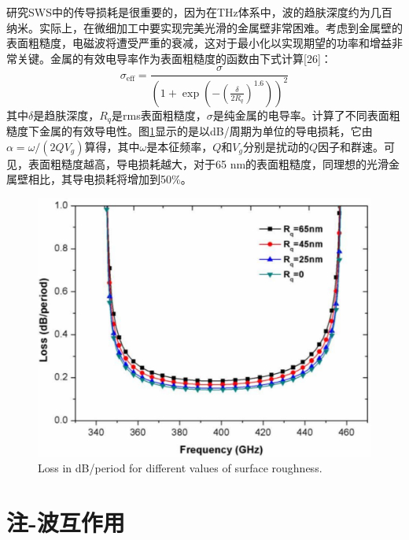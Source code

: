 \documentclass[10pt,a4paper,UTF8]{ctexart}
\begin{document}
研究SWS中的传导损耗是很重要的，因为在THz体系中，波的趋肤深度约为几百纳米。实际上，在微细加工中要实现完美光滑的金属壁非常困难。考虑到金属壁的表面粗糙度，电磁波将遭受严重的衰减，这对于最小化以实现期望的功率和增益非常关键。金属的有效电导率作为表面粗糙度的函数由下式计算[26]：
\begin{equation} \label{eq:2}
\sigma_{\mathrm{eff}} = \frac{\sigma}{\left( 1+\exp\left( -\left( \frac{\delta}{2R_q}\right)^{1.6}\right) \right)^2  }
\end{equation}
其中$ \delta $是趋肤深度，$ R_q $是rms表面粗糙度，$ \sigma $是纯金属的电导率。计算了不同表面粗糙度下金属的有效导电性。图\ref{fig6}显示的是以dB/周期为单位的导电损耗，它由$ \alpha = \omega/\left(2QV_g\right) $算得，其中$ \omega $是本征频率，$ Q $和$ V_g $分别是扰动的$ Q $因子和群速。可见，表面粗糙度越高，导电损耗越大，对于65 nm的表面粗糙度，同理想的光滑金属壁相比，其导电损耗将增加到50\%。
\begin{figure}[phtb]
	\centering
	\includegraphics[width=0.95\linewidth]{figure/fig6}
	\caption{Loss in dB/period for different values of surface roughness.}
	\label{fig6}
\end{figure}

\section{注-波互作用} \label{sec:4}
\end{document}
